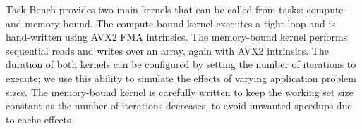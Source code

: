 Task Bench provides two main kernels that can be called from tasks:
compute- and memory-bound. The compute-bound
kernel executes a tight loop and is hand-written using AVX2 FMA
intrinsics. The memory-bound kernel performs sequential reads and
writes over an array, again with AVX2
intrinsics. The duration of both kernels can be configured by setting
the number of iterations to execute; we use this ability to simulate
the effects of varying application problem sizes. The memory-bound
kernel is carefully written to keep the working set size constant as
the number of iterations decreases, to avoid unwanted speedups due to
cache effects.
